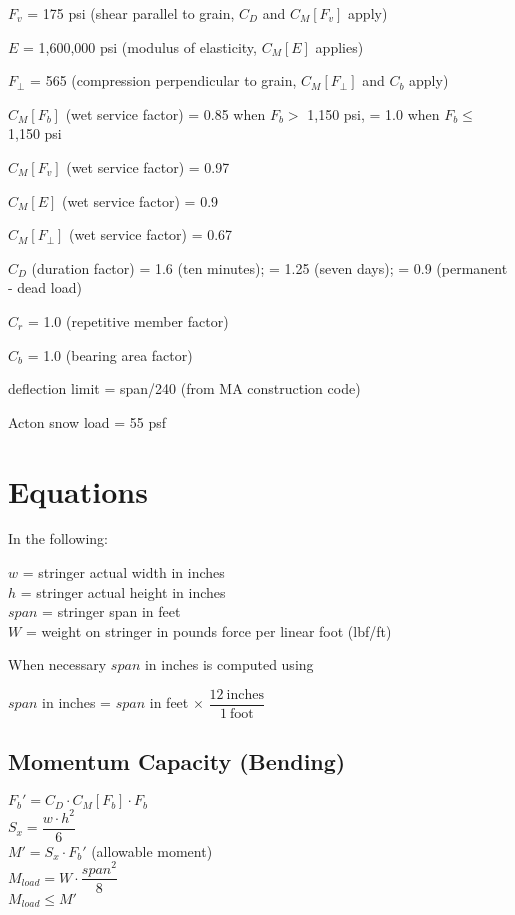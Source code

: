 \documentclass[12pt]{article}
\newenvironment{indpar}[1][0.3in]%
	{\begin{list}{}%
		     {\setlength{\itemsep}{0in}%
		      \setlength{\topsep}{0in}%
		      \setlength{\parsep}{1ex}%
		      \setlength{\labelwidth}{#1}%
		      \setlength{\leftmargin}{#1}%
		      \addtolength{\leftmargin}{\labelsep}}%
	 \item}%
	{\end{list}}
\begin{document}
$F_v$ = 175 psi (shear parallel to grain, $C_D$ and $C_M[F_v]$ apply)

$E$ = 1,600,000 psi (modulus of elasticity, $C_M[E]$ applies)

$F_\perp$ = 565 (compression perpendicular to grain, $C_M[F_\perp]$ and $C_b$
                 apply)

$C_M[F_b]$ (wet service factor)
    = 0.85 when $F_b >$ 1,150 psi, = 1.0 when $F_b \leq$ 1,150 psi

$C_M[F_v]$ (wet service factor) = 0.97

$C_M[E]$ (wet service factor) = 0.9

$C_M[F_\perp]$ (wet service factor) = 0.67

$C_D$ (duration factor) = 1.6 (ten minutes); = 1.25 (seven days);
                        = 0.9 (permanent - dead load)

$C_r$ = 1.0 (repetitive member factor)

$C_b$ = 1.0 (bearing area factor)

deflection limit = span/240 (from MA construction code)

Acton snow load = 55 psf

\newpage
\section{Equations}

In the following:

\begin{indpar}
$w$ = stringer actual width in inches \\
$h$ = stringer actual height in inches \\
$span$ = stringer span in feet \\
$W$ = weight on stringer in pounds force per linear foot (lbf/ft)
\end{indpar}
When necessary $span$ in inches is computed using
\begin{indpar}
$span$ in inches  = $span$ in feet $\times$
                    $\dfrac{12~\mathrm{inches}}{1~\mathrm{foot}}$
\end{indpar}

\subsection{Momentum Capacity (Bending)}

$F_b' = C_D \cdot C_M[F_b] \cdot F_b$ \\[0.5ex]
$S_x = \dfrac{w\cdot h^2}{6}$ \\[0.5ex]
$M' = S_x \cdot F_b'$ (allowable moment) \\[0.5ex]
$M_{load} = W \cdot \dfrac{span^2}{8}$ \\[0.5ex]
$M_{load} \leq M'$
\end{document}
